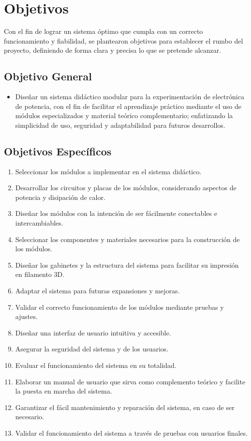 \section{Objetivos}
\justifying

Con el fin de lograr un sistema óptimo que cumpla con un correcto funcionamiento y fiabilidad, se plantearon objetivos para establecer el rumbo del proyecto, definiendo de forma clara y precisa lo que se pretende alcanzar.

\subsection{Objetivo General}
\begin{itemize}[noitemsep]
    \item Diseñar un sistema didáctico modular para la experimentación de electrónica de potencia, con el fin de facilitar el aprendizaje práctico mediante el uso de módulos especializados y material teórico complementario; enfatizando la simplicidad de uso, seguridad y adaptabilidad para futuros desarrollos.
\end{itemize}

\subsection{Objetivos Específicos}

\begin{enumerate}[noitemsep]
    \item Seleccionar los módulos a implementar en el sistema didáctico.
    \item Desarrollar los circuitos y placas de los módulos, considerando aspectos de potencia y disipación de calor.
    \item Diseñar los módulos con la intención de ser fácilmente conectables e intercambiables.
    \item Seleccionar los componentes y materiales necesarios para la construcción de los módulos.
    \item Diseñar los gabinetes y la estructura del sistema para facilitar su impresión en filamento 3D.
    \item Adaptar el sistema para futuras expansiones y mejoras.
    \item Validar el correcto funcionamiento de los módulos mediante pruebas y ajustes.
    \item Diseñar una interfaz de usuario intuitiva y accesible.
    \item Asegurar la seguridad del sistema y de los usuarios.
    \item Evaluar el funcionamiento del sistema en su totalidad.
    \item Elaborar un manual de usuario que sirva como complemento teórico y facilite la puesta en marcha del sistema.
    \item Garantizar el fácil mantenimiento y reparación del sistema, en caso de ser necesario.    
    \item Validar el funcionamiento del sistema a través de pruebas con usuarios finales.
\end{enumerate}